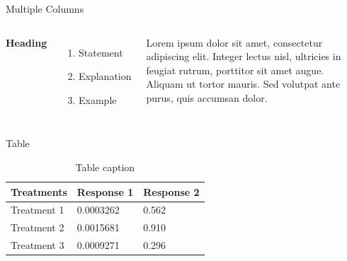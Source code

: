 \documentclass[aspectratio=169,xcolor=dvipsnames]{beamer}
\begin{document}

\begin{frame}{Multiple Columns}
    \begin{columns}[c] %

        \textbf{Heading}
        \begin{enumerate}
            \item Statement
            \item Explanation
            \item Example
        \end{enumerate}

        Lorem ipsum dolor sit amet, consectetur adipiscing elit. Integer lectus nisl, ultricies in feugiat rutrum, porttitor sit amet augue. Aliquam ut tortor mauris. Sed volutpat ante purus, quis accumsan dolor.

    \end{columns}
\end{frame}


\begin{frame}{Table}
    \begin{table}
        \begin{tabular}{l l l}
            \toprule
            \textbf{Treatments} & \textbf{Response 1} & \textbf{Response 2} \\
            \midrule
            Treatment 1         & 0.0003262           & 0.562               \\
            Treatment 2         & 0.0015681           & 0.910               \\
            Treatment 3         & 0.0009271           & 0.296               \\
            \bottomrule
        \end{tabular}
        \caption{Table caption}
    \end{table}
\end{frame}
\end{document}

